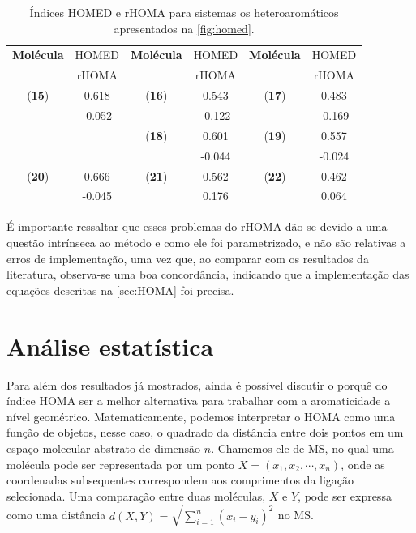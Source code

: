 \begin{table}[htb]
	\centering
	\caption{\label{tab:homed/homa2} Índices \gls{HOMED} e \gls{rHOMA} para sistemas os heteroaromáticos apresentados na \autoref{fig:homed}.}
	\begin{tabular}{cccccc}
		\toprule
	\textbf{Molécula} & \gls{HOMED} & \textbf{Molécula} & \gls{HOMED} & \textbf{Molécula} & \gls{HOMED}
 \\
  & \gls{rHOMA} & & \gls{rHOMA} & & \gls{rHOMA}
 \\
		\midrule
    (\textbf{15}) & 0.618 & (\textbf{16}) & 0.543 & (\textbf{17}) & 0.483 \\
     & -0.052 &  & -0.122 &  & -0.169 \\
    & & (\textbf{18}) & 0.601 & (\textbf{19}) & 0.557 \\
    & &  & -0.044 & & -0.024 \\
    (\textbf{20}) & 0.666 & (\textbf{21}) & 0.562 & (\textbf{22}) & 0.462 \\
    & -0.045 & & 0.176 & & 0.064 \\
    \bottomrule
	\end{tabular}
\end{table}


 É importante ressaltar que esses problemas do \gls{rHOMA} dão-se devido a uma questão intrínseca ao método e como ele foi parametrizado, e não são relativas a erros de implementação, uma vez que, ao comparar com os resultados da literatura, observa-se uma boa concordância, indicando que a implementação das equações descritas na \autoref{sec:HOMA} foi precisa.

\section{Análise estatística}

Para além dos resultados já mostrados, ainda é possível discutir o porquê do índice \gls{HOMA} ser a melhor alternativa para trabalhar com a aromaticidade a nível geométrico. Matematicamente, podemos interpretar o \gls{HOMA} como uma função de objetos, nesse caso, o quadrado da distância entre dois pontos em um espaço molecular abstrato de dimensão $n$. Chamemos ele de \gls{MS}, no qual uma molécula pode ser representada por um ponto $X = (x_1, x_2, \cdots, x_n)$, onde as coordenadas subsequentes correspondem aos comprimentos da ligação  selecionada. Uma comparação entre duas moléculas, $X$ e $Y$, pode ser expressa como uma distância $d(X, Y) = \displaystyle \sqrt{\sum_{i=1}^{n} (x_i - y_i)^2}$ no \gls{MS}. 

